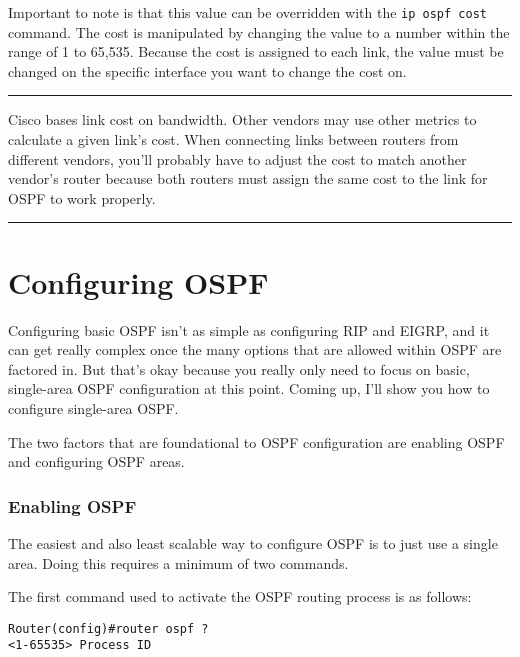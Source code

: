 Important to note is that this value can be overridden with the
\texttt{ip\ ospf\ cost} command. The cost is manipulated by changing the
value to a number within the range of 1 to 65,535. Because the cost is
assigned to each link, the value must be changed on the specific
interface you want to change the cost on.

\begin{center}\rule{0.5\linewidth}{0.5pt}\end{center}

Cisco bases link cost on bandwidth.
Other vendors may use other metrics to calculate a given link's cost.
When connecting links between routers from different vendors, you'll
probably have to adjust the cost to match another vendor's router
because both routers must assign the same cost to the link for OSPF to
work properly.

\begin{center}\rule{0.5\linewidth}{0.5pt}\end{center}



\section{Configuring OSPF}

Configuring basic OSPF isn't as simple as configuring RIP and EIGRP, and
it can get really complex once the many options that are allowed within
OSPF are factored in. But that's okay because you really only need to
focus on basic, single-area OSPF configuration at this point. Coming up,
I'll show you how to configure single-area OSPF.

The two factors that are foundational to OSPF configuration are enabling
OSPF and configuring OSPF areas.

\subsubsection[Enabling
OSPF]{\texorpdfstring{\protect\hypertarget{c18.xhtmlux5cux23c18-sec-6}{}{}Enabling
OSPF}{Enabling OSPF}}

The easiest and also least scalable way to configure OSPF is to just use
a single area. Doing this requires a minimum of two commands.

The first command used to activate the OSPF routing process is as
follows:

\begin{verbatim}
Router(config)#router ospf ?
<1-65535> Process ID
\end{verbatim}

